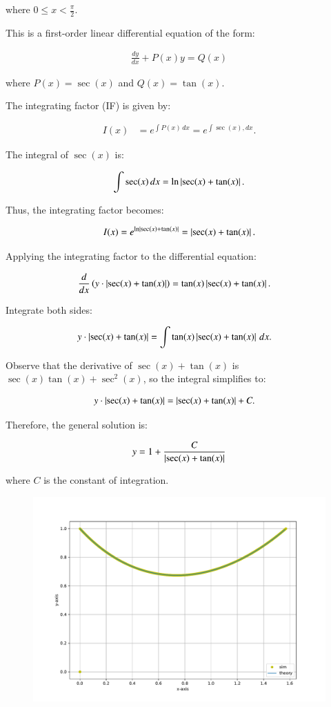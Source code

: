 \documentclass[journal]{IEEEtran}
\begin{document}
where $0 \leq x < \frac{\pi}{2}$.

This is a first-order linear differential equation of the form:

\begin{align*}
\frac{dy}{dx} + P(x)y = Q(x)
\end{align*}

where $P(x) = \sec(x)$ and $Q(x) = \tan(x)$.

The integrating factor (IF) is given by:

\begin{align*}
I(x) &= e^{\int P(x) \, dx} = e^{\int \sec (x), dx}.
\end{align*}

The integral of $\sec(x)$ is:

\begin{align*}
\int \sec(x) \, dx = \ln \left\vert\sec(x) + \tan(x)\right\vert.
\end{align*}

Thus, the integrating factor becomes:

\begin{align*}
I(x) = e^{\ln\left\vert\sec(x) + \tan(x)\right\vert} = \left\vert\sec(x) + \tan(x)\right\vert.
\end{align*}

Applying the integrating factor to the differential equation:

\begin{align*}
\frac{d}{dx}\left( y \cdot \left\vert\sec(x) + \tan(x)\right\vert\right) &= \tan(x) \left\vert\sec(x) + \tan(x)\right\vert.
\end{align*}

Integrate both sides:

\begin{align*}
y \cdot \left\vert\sec(x) + \tan(x)\right\vert &= \int \tan(x) \left\vert\sec(x) + \tan(x)\right\vert \, dx.
\end{align*}

Observe that the derivative of $\sec(x) + \tan(x)$ is $\sec(x)\tan(x) + \sec^2(x)$, so the integral simplifies to:

\begin{align*}
y \cdot \left\vert\sec(x) + \tan(x)\right\vert &= \left\vert\sec(x) + \tan(x)\right\vert + C.
\end{align*}

Therefore, the general solution is:

\begin{align*}
y = 1 + \frac{C}{\left\vert\sec(x) + \tan(x)\right\vert}
\end{align*}

where $C$ is the constant of integration.

\begin{figure}[h!]
   \centering
   \includegraphics[width=0.7\columnwidth]{figs/combined_plot.pdf}
\end{figure}
\end{document}
